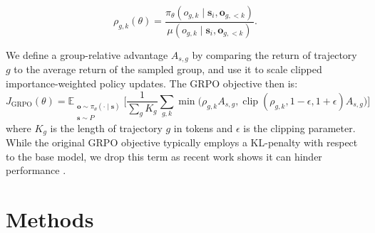 \documentclass[]{servicenow} %
\begin{document}
\begin{equation*}
    \rho_{g,k}(\theta)
= \frac{\pi_\theta(o_{g,k} \mid \mathbf{s}_i, \mathbf{o}_{g,<k})}{\mu(o_{g,k} \mid \mathbf{s}_i, \mathbf{o}_{g,<k})}.
\end{equation*}

We define a group-relative advantage $A_{s,g}$ by comparing the return of trajectory $g$ to the average return of the sampled group, and use it to scale clipped importance-weighted policy updates.
The GRPO objective then is:
\begin{equation}
\label{eq:grpo}
J_{\text{GRPO}}(\theta) = \mathbb{E}_{\substack{\mathbf{o} \sim \pi_\theta(\cdot \mid \mathbf{s}) \\ \mathbf{s} \sim P}} \Bigg[ \frac{1}{\sum_g K_g} \sum_{g, k} \min \Big( \rho_{g,k} A_{s,g}, \operatorname{clip}(\rho_{g,k}, 1{-}\epsilon, 1{+}\epsilon) A_{s,g} \Big) \Bigg]
\end{equation}
where $K_g$ is the length of trajectory $g$ in tokens and $\epsilon$ is the clipping parameter. While the original GRPO objective typically employs a KL-penalty with respect to the base model, we drop this term as recent work shows it can hinder performance \citep{shah2026comedyestimatorsklregularization}.







 



\section{Methods}
\end{document}
